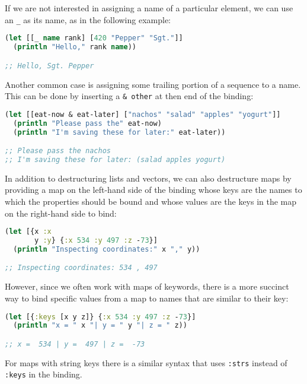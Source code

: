 \documentclass[10pt,twoside,openright]{memoir}
\begin{document}
If we are not interested in assigning a name of a particular element, we
can use an \texttt{\_} as its name, as in the following example:

\begin{lstlisting}[language=Clojure, caption={Discarding a value}]
(let [[_ name rank] [420 "Pepper" "Sgt."]]
  (println "Hello," rank name))

;; Hello, Sgt. Pepper
\end{lstlisting}

Another common case is assigning some trailing portion of a sequence to
a name. This can be done by inserting a \texttt{\&\ other} at then end
of the binding:

\begin{lstlisting}[language=Clojure, caption={Rest bindings}]
(let [[eat-now & eat-later] ["nachos" "salad" "apples" "yogurt"]]
  (println "Please pass the" eat-now)
  (println "I'm saving these for later:" eat-later))

;; Please pass the nachos
;; I'm saving these for later: (salad apples yogurt)
\end{lstlisting}

In addition to destructuring lists and vectors, we can also destructure
maps by providing a map on the left-hand side of the binding whose keys
are the names to which the properties should be bound and whose values
are the keys in the map on the right-hand side to bind:

\begin{lstlisting}[language=Clojure, caption={Map bindings}]
(let [{x :x
       y :y} {:x 534 :y 497 :z -73}]
  (println "Inspecting coordinates:" x "," y))

;; Inspecting coordinates: 534 , 497
\end{lstlisting}

However, since we often work with maps of keywords, there is a more
succinct way to bind specific values from a map to names that are
similar to their key:

\begin{lstlisting}[language=Clojure, caption={Binding keys}]
(let [{:keys [x y z]} {:x 534 :y 497 :z -73}]
  (println "x = " x "| y = " y "| z = " z))

;; x =  534 | y =  497 | z =  -73
\end{lstlisting}

For maps with string keys there is a similar syntax that uses
\texttt{:strs} instead of \texttt{:keys} in the binding.
\end{document}
